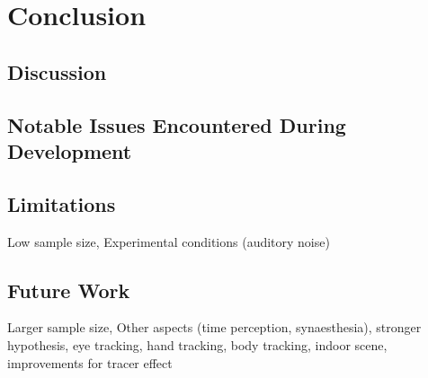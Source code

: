 \chapter{Conclusion}

\section{Discussion}

\section{Notable Issues Encountered During Development}

\section{Limitations}
Low sample size, Experimental conditions (auditory noise)

\section{Future Work}
Larger sample size, Other aspects (time perception, synaesthesia), stronger hypothesis, eye tracking, hand tracking, body tracking, indoor scene, improvements for tracer effect
